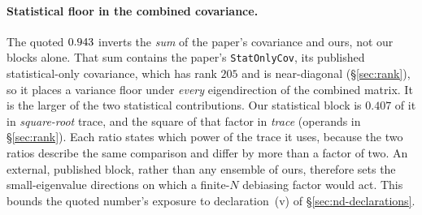 \paragraph{Statistical floor in the combined covariance.} The quoted $0.943$ inverts the \emph{sum} of the paper's covariance and ours, not our blocks alone. That sum contains the paper's \texttt{StatOnlyCov}, its published statistical-only covariance, which has rank $205$ and is near-diagonal (\S\ref{sec:rank}), so it places a variance floor under \emph{every} eigendirection of the combined matrix. It is the larger of the two statistical contributions. Our statistical block is $0.407$ of it in \emph{square-root} trace, and the square of that factor in \emph{trace} (operands in \S\ref{sec:rank}). Each ratio states which power of the trace it uses, because the two ratios describe the same comparison and differ by more than a factor of two. An external, published block, rather than any ensemble of ours, therefore sets the small-eigenvalue directions on which a finite-$N$ debiasing factor would act. This bounds the quoted number's exposure to declaration~(v) of \S\ref{sec:nd-declarations}.

